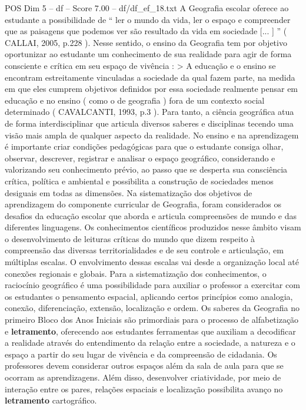 \begin{textsample}{POS Dim 5 – df – Score 7.00 – df/df\_ef\_18.txt}
A Geografia escolar oferece ao estudante a possibilidade de “ ler o mundo da vida, ler o espaço e compreender que as paisagens que podemos ver são resultado da vida em sociedade [... ] ” ( CALLAI, 2005, p.228 ).
Nesse sentido, o ensino da Geografia tem por objetivo oportunizar ao estudante um conhecimento de sua realidade para agir de forma consciente e crítica em seu espaço de vivência : > A educação e o ensino se encontram estreitamente vinculadas a sociedade da qual fazem parte, na medida em que eles cumprem objetivos definidos por essa sociedade realmente pensar em educação e no ensino ( como o de geografia ) fora de um contexto social determinado ( CAVALCANTI, 1993, p.3 ).
Para tanto, a ciência geográfica atua de forma interdisciplinar que articula diversos saberes e disciplinas tecendo uma visão mais ampla de qualquer aspecto da realidade.
No ensino e na aprendizagem é importante criar condições pedagógicas para que o estudante consiga olhar, observar, descrever, registrar e analisar o espaço geográfico, considerando e valorizando seu conhecimento prévio, ao passo que se desperta sua consciência crítica, política e ambiental e possibilita a construção de sociedades menos desiguais em todas as dimensões.
Na sistematização dos objetivos de aprendizagem do componente curricular de Geografia, foram considerados os desafios da educação escolar que aborda e articula compreensões de mundo e das diferentes linguagens.
Os conhecimentos científicos produzidos nesse âmbito visam o desenvolvimento de leituras críticas do mundo que dizem respeito à compreensão das diversas territorialidades e de seu controle e articulação, em múltiplas escalas.
O envolvimento dessas escalas vai desde a organização local até conexões regionais e globais.
Para a sistematização dos conhecimentos, o raciocínio geográfico é uma possibilidade para auxiliar o professor a exercitar com os estudantes o pensamento espacial, aplicando certos princípios como analogia, conexão, diferenciação, extensão, localização e ordem.
Os saberes da Geografia no primeiro Bloco dos Anos Iniciais são primordiais para o processo de alfabetização e \textbf{letramento}, oferecendo aos estudantes ferramentas que auxiliam a decodificar a realidade através do entendimento da relação entre a sociedade, a natureza e o espaço a partir do seu lugar de vivência e da compreensão de cidadania.
Os professores devem considerar outros espaços além da sala de aula para que se ocorram as aprendizagens.
Além disso, desenvolver criatividade, por meio de interação entre os pares, relações espaciais e localização possibilita avanço no \textbf{letramento} cartográfico.

\end{textsample}
